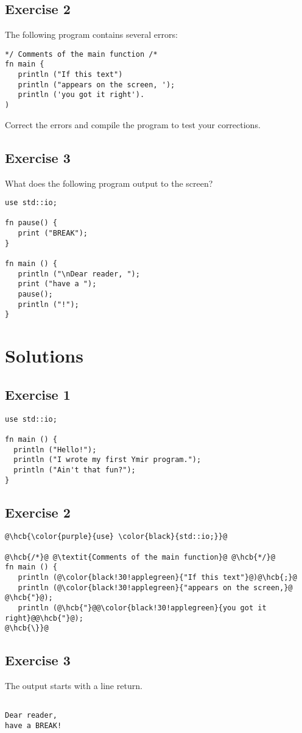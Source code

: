 \subsection{Exercise 2}
The following program contains several errors:

\begin{lstlisting}[style=bashVerb, caption=Ymir program with errors]
*/ Comments of the main function /*
fn main {
   println ("If this text")
   println ("appears on the screen, ');
   println ('you got it right').
)
\end{lstlisting}
Correct the errors and compile the program to test your corrections.

\subsection{Exercise 3}

What does the following program output to the screen?
\begin{lstlisting}[style=coloredverbatim]
use std::io;

fn pause() {
   print ("BREAK");
}

fn main () {
   println ("\nDear reader, ");
   print ("have a ");
   pause();
   println ("!");
}
\end{lstlisting}

\vfill%
\pagebreak
\section{Solutions}
\subsection{Exercise 1}

\begin{lstlisting}[style=coloredverbatim, caption=Solution for exercise 1]
use std::io;

fn main () {
  println ("Hello!");
  println ("I wrote my first Ymir program.");
  println ("Ain't that fun?");
}
\end{lstlisting}

\subsection{Exercise 2}

\begin{lstlisting}[style=coloredverbatimCorrect, escapechar=@]
@\hcb{\color{purple}{use} \color{black}{std::io;}}@

@\hcb{/*}@ @\textit{Comments of the main function}@ @\hcb{*/}@
fn main () {
   println (@\color{black!30!applegreen}{"If this text"}@)@\hcb{;}@
   println (@\color{black!30!applegreen}{"appears on the screen,}@ @\hcb{"}@);
   println (@\hcb{"}@@\color{black!30!applegreen}{you got it right}@@\hcb{"}@);
@\hcb{\}}@
\end{lstlisting}

\subsection{Exercise 3}
The output starts with a line return.
\begin{lstlisting}[style=bashVerb]

Dear reader,
have a BREAK!
\end{lstlisting}
